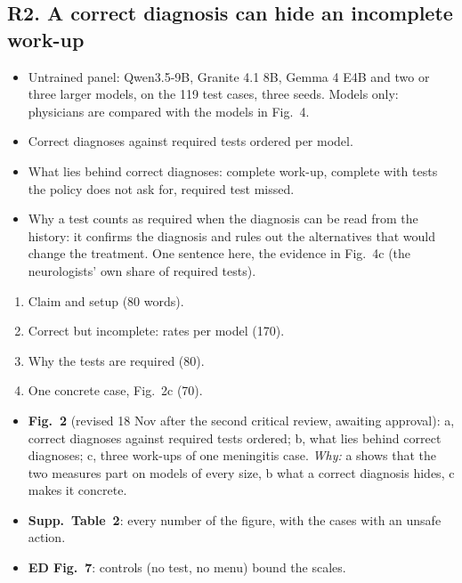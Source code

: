 \subsection{R2. A correct diagnosis can hide an incomplete work-up}\label{sec:outcome}


\content
\begin{itemize}
\item Untrained panel: Qwen3.5-9B, Granite 4.1 8B, Gemma 4 E4B and two or three larger models, on the
119 test cases, three seeds. Models only: physicians are compared with the models in Fig.~4.
\item Correct diagnoses against required tests ordered per model.
\item What lies behind correct diagnoses: complete work-up, complete with tests the policy does not ask
for, required test missed.
\item Why a test counts as required when the diagnosis can be read from the history: it confirms the
diagnosis and rules out the alternatives that would change the treatment. One sentence here, the
evidence in Fig.~4c (the neurologists' own share of required tests).
\end{itemize}

\structure
\begin{enumerate}
\item Claim and setup (80 words).
\item Correct but incomplete: rates per model (170).
\item Why the tests are required (80).
\item One concrete case, Fig.~2c (70).
\end{enumerate}

\artefacts
\begin{itemize}
\item \textbf{Fig.~2} (revised 18 Nov after the second critical review, awaiting approval): a, correct
diagnoses against required tests ordered; b, what lies behind correct diagnoses; c, three work-ups of
one meningitis case. \emph{Why:} a shows that the two measures part on models of every size, b what a
correct diagnosis hides, c makes it concrete.
\item \textbf{Supp.\ Table~2}: every number of the figure, with the cases with an unsafe action.
\item \textbf{ED Fig.~7}: controls (no test, no menu) bound the scales.
\end{itemize}

